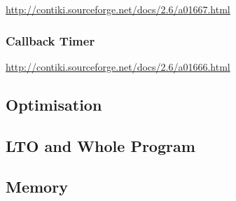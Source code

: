 \url{http://contiki.sourceforge.net/docs/2.6/a01667.html}

\subsubsection{Callback Timer}

\url{http://contiki.sourceforge.net/docs/2.6/a01666.html}


\subsection{Optimisation}

\subsection{LTO and Whole Program}



\subsection{Memory}

